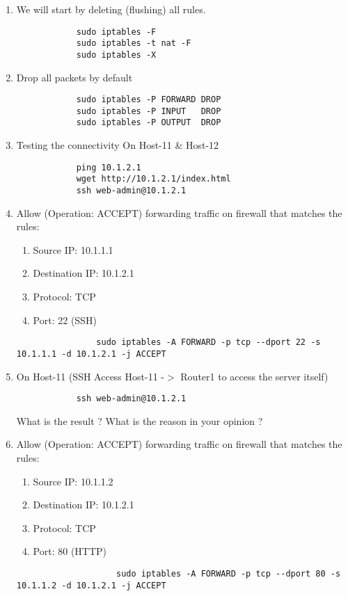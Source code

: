 \begin{enumerate}
	\item We will start by deleting (flushing) all rules.
	\begin{verbatim}
			sudo iptables -F
			sudo iptables -t nat -F
			sudo iptables -X
	\end{verbatim}

	\item Drop all packets by default
	\begin{verbatim}
			sudo iptables -P FORWARD DROP
			sudo iptables -P INPUT   DROP
			sudo iptables -P OUTPUT  DROP
	\end{verbatim}

  \item Testing the connectivity On Host-11 \& Host-12
	\begin{verbatim}
			ping 10.1.2.1
			wget http://10.1.2.1/index.html
			ssh web-admin@10.1.2.1
	\end{verbatim}

	\item Allow (Operation: ACCEPT) forwarding traffic on firewall that matches the rules:
		\begin{enumerate}
			\item Source IP: 10.1.1.1
			\item Destination IP: 10.1.2.1
			\item	Protocol: TCP
			\item Port: 22 (SSH)
		\end{enumerate}
		\begin{verbatim}
				sudo iptables -A FORWARD -p tcp --dport 22 -s 10.1.1.1 -d 10.1.2.1 -j ACCEPT
		\end{verbatim}

		\item On Host-11 (SSH Access Host-11 -$>$ Router1 to access the server itself)
		\begin{verbatim}
		    ssh web-admin@10.1.2.1
		\end{verbatim}

		What is the result ? What is the reason in your opinion ?

		\item Allow (Operation: ACCEPT) forwarding traffic on firewall that matches the rules:
			\begin{enumerate}
				\item Source IP: 10.1.1.2
				\item Destination IP: 10.1.2.1
				\item	Protocol: TCP
				\item Port: 80 (HTTP)
			\end{enumerate}
			\begin{verbatim}
					sudo iptables -A FORWARD -p tcp --dport 80 -s 10.1.1.2 -d 10.1.2.1 -j ACCEPT
			\end{verbatim}


\end{enumerate}
